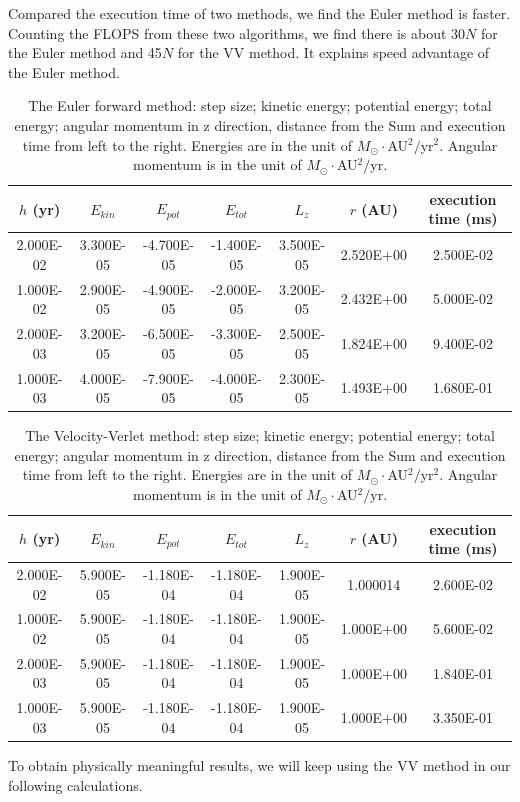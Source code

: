  Compared the execution time of two methods, we find the Euler method is faster. 
 Counting the FLOPS from these two algorithms, we find there is  about 30$N$ for the Euler method and 45$N$ for the VV method. It explains speed advantage of the Euler method.
 
\begin{table}[tb]
	\centering
	\caption{The Euler forward method: step size; kinetic energy; potential energy; total energy; angular momentum in z direction, distance from the Sum and execution time from left to the right.
	Energies are in the unit of $M_{\odot}\cdot$AU$^2/$yr$^2$. Angular momentum is in the unit of $M_{\odot}\cdot$AU$^2/$yr. }
	\label{tab::euler}
	\begin{tabular}{ccccccc}
	\hline
	\hline
$h$ (yr) & $E_{kin}$       & $E_{pot}$         & $E_{tot}$          & $L_z$        & $r$ (AU)        & execution time (ms)         \\
	\hline
2.000E-02 & 3.300E-05 & -4.700E-05 & -1.400E-05 & 3.500E-05 & 2.520E+00 & 2.500E-02 \\
1.000E-02 & 2.900E-05 & -4.900E-05 & -2.000E-05 & 3.200E-05 & 2.432E+00 & 5.000E-02 \\
2.000E-03 & 3.200E-05 & -6.500E-05 & -3.300E-05 & 2.500E-05 & 1.824E+00 & 9.400E-02 \\
1.000E-03 & 4.000E-05 & -7.900E-05 & -4.000E-05 & 2.300E-05 & 1.493E+00 & 1.680E-01\\
	\hline
	\hline
\end{tabular}
\end{table}

\begin{table}[tb]
	\centering
	\caption{The Velocity-Verlet method: step size; kinetic energy; potential energy; total energy; angular momentum in z direction, distance from the Sum and execution time from left to the right.
	Energies are in the unit of $M_{\odot}\cdot$AU$^2/$yr$^2$. Angular momentum is in the unit of $M_{\odot}\cdot$AU$^2/$yr. }
	\label{tab::verlet}
	\begin{tabular}{ccccccc}
	\hline
	\hline
$h$ (yr)      & $E_{kin}$        & $E_{pot}$         & $E_{tot}$          & $L_z$        & $r$ (AU)     & execution time (ms)         \\
	\hline
2.000E-02 & 5.900E-05 & -1.180E-04 & -1.180E-04 & 1.900E-05 & 1.000014 & 2.600E-02 \\
1.000E-02 & 5.900E-05 & -1.180E-04 & -1.180E-04 & 1.900E-05 & 1.000E+00 & 5.600E-02 \\
2.000E-03 & 5.900E-05 & -1.180E-04 & -1.180E-04 & 1.900E-05 & 1.000E+00 & 1.840E-01 \\
1.000E-03 & 5.900E-05 & -1.180E-04 & -1.180E-04 & 1.900E-05 & 1.000E+00 & 3.350E-01\\
	\hline
	\hline
\end{tabular}
\end{table}

To obtain physically meaningful results, we will keep using the VV method in our following calculations.